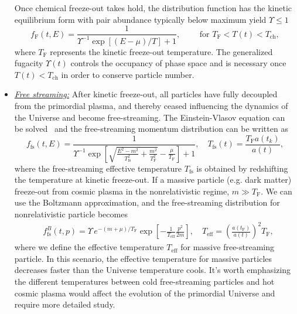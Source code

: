 \begin{itemize}
Once chemical freeze-out takes hold,  the distribution function has the kinetic equilibrium form with pair abundance typically below maximum yield $\Upsilon \le 1$
\begin{equation}\label{kinetic_equilib}
f_\mathrm{F}(t,E)=\frac{1}{\Upsilon^{-1}\exp[(E-\mu)/T]+1},\qquad \text{ for }T_\mathrm{F}< T(t)< T_\mathrm{ch},
\end{equation}
where $T_\mathrm{F}$ represents the kinetic freeze-out temperature. The generalized fugacity $\Upsilon(t)$ controls the occupancy of phase space and is necessary once $T(t)<T_\mathrm{ch}$ in order to conserve particle number.
%
\item \underline{\it Free streaming:\/}
After kinetic freeze-out, all particles have fully decoupled from the primordial plasma, and thereby ceased influencing the dynamics of the Universe and become free-streaming. The Einstein-Vlasov equation can be solved~\cite{Choquet-Bruhat:2009xil} and the free-streaming momentum distribution can be written as~\cite{Birrell:2012gg}
\begin{equation}\label{free_stream_dist}
f_\mathrm{fs}(t,E)=\frac{1}{\Upsilon^{-1}\exp{\left[\sqrt{\frac{E^2-m^2}{T_\mathrm{fs}^2}+\frac{m^2}{T^2_\mathrm{F}}}-\frac{\mu}{T_\mathrm{F}}\right]+1}},\quad T_\mathrm{fs}(t)=\frac{T_\mathrm{F}a(t_k)}{a(t)},
\end{equation}
where the free-streaming effective temperature $T_\mathrm{fs}$ is obtained by redshifting the temperature at kinetic freeze-out. If a massive particle (e.g. dark matter) freeze-out from cosmic plasma in the nonrelativistic regime, $m\gg T_\mathrm{F}$. We can use the
Boltzmann approximation, and the free-streaming distribution for nonrelativistic particle becomes
\begin{align}
&f^B_\mathrm{fs}(t,p)=\Upsilon\,e^{-(m+\mu)/T_\mathrm{F}}\exp\left[-\frac{1}{ T_\mathrm{eff}}\frac{p^2}{2m}\right],\quad T_\mathrm{eff}=\left(\frac{a(t_\mathrm{F})}{a(t)}\right)^2T_\mathrm{F},
\end{align}
where we define the effective temperature $T_\mathrm{eff}$ for massive free-streaming particle. In this scenario, the effective temperature for massive particles decreases faster than the Universe temperature cools. It's worth emphasizing the different temperatures between cold free-streaming particles and hot cosmic plasma would affect the evolution of the primordial Universe and require more detailed study. 
\end{itemize}

